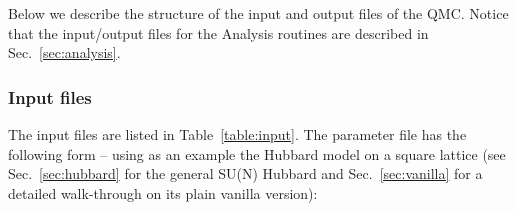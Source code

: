 Below we describe the structure of the input and output files of the QMC. Notice that the input/output files for the Analysis routines are described in Sec.~\ref{sec:analysis}.

\subsubsection{Input files}\label{sec:input}
%

The input files are listed in Table~\ref{table:input}. 
The parameter file  has the following form --
using as an example the Hubbard model on a square lattice (see Sec.~\ref{sec:hubbard} for the general SU(N) Hubbard and Sec.~\ref{sec:vanilla} for a detailed walk-through on its plain vanilla version):
%
